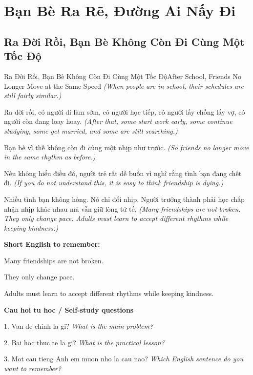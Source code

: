 \chapter{Bạn Bè Ra Rẽ, Đường Ai Nấy Đi}

\section{Ra Đời Rồi, Bạn Bè Không Còn Đi Cùng Một Tốc Độ}
\begin{truyen}{Ra Đời Rồi, Bạn Bè Không Còn Đi Cùng Một Tốc Độ}{After School, Friends No Longer Move at the Same Speed}
\textit{(When people are in school, their schedules are still fairly similar.)}

Ra đời rồi, có người đi làm sớm, có người học tiếp, có người lấy chồng lấy vợ, có người còn đang loay hoay.
\textit{(After that, some start work early, some continue studying, some get married, and some are still searching.)}

Bạn bè vì thế không còn đi cùng một nhịp như trước.
\textit{(So friends no longer move in the same rhythm as before.)}

Nếu không hiểu điều đó, người trẻ rất dễ buồn vì nghĩ rằng tình bạn đang chết đi.
\textit{(If you do not understand this, it is easy to think friendship is dying.)}

\end{truyen}

\begin{baihoc}
Nhiều tình bạn không hỏng. Nó chỉ đổi nhịp. Người trưởng thành phải học chấp nhận nhịp khác nhau mà vẫn giữ lòng tử tế.
\textit{(Many friendships are not broken. They only change pace. Adults must learn to accept different rhythms while keeping kindness.)}
\end{baihoc}

\begin{ghinhoanh}
\textbf{Short English to remember:}

Many friendships are not broken.

They only change pace.

Adults must learn to accept different rhythms while keeping kindness.

\end{ghinhoanh}

\begin{tuhocnhanh}
\textbf{Cau hoi tu hoc / Self-study questions}

1. Van de chinh la gi? \textit{What is the main problem?}

2. Bai hoc thuc te la gi? \textit{What is the practical lesson?}

3. Mot cau tieng Anh em muon nho la cau nao? \textit{Which English sentence do you want to remember?}
\end{tuhocnhanh}
\ngancach

